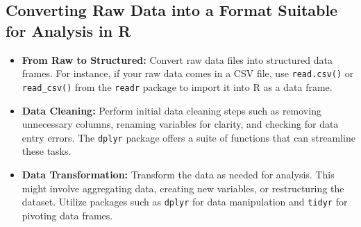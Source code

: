\documentclass[
]{book}
\newenvironment{Shaded}{\begin{snugshade}}{\end{snugshade}}
\newcommand{\AttributeTok}[1]{\textcolor[rgb]{0.13,0.29,0.53}{#1}}
\newcommand{\CommentTok}[1]{\textcolor[rgb]{0.56,0.35,0.01}{\textit{#1}}}
\newcommand{\ConstantTok}[1]{\textcolor[rgb]{0.56,0.35,0.01}{#1}}
\newcommand{\DecValTok}[1]{\textcolor[rgb]{0.00,0.00,0.81}{#1}}
\newcommand{\FunctionTok}[1]{\textcolor[rgb]{0.13,0.29,0.53}{\textbf{#1}}}
\newcommand{\NormalTok}[1]{#1}
\newcommand{\OtherTok}[1]{\textcolor[rgb]{0.56,0.35,0.01}{#1}}
\newcommand{\SpecialCharTok}[1]{\textcolor[rgb]{0.81,0.36,0.00}{\textbf{#1}}}
\newcommand{\StringTok}[1]{\textcolor[rgb]{0.31,0.60,0.02}{#1}}
\begin{document}
\begin{Shaded}
\end{Shaded}

\hypertarget{converting-raw-data-into-a-format-suitable-for-analysis-in-r}{%
\subsection*{Converting Raw Data into a Format Suitable for Analysis in R}\label{converting-raw-data-into-a-format-suitable-for-analysis-in-r}}

\begin{itemize}
\item
  \textbf{From Raw to Structured:} Convert raw data files into structured data frames. For instance, if your raw data comes in a CSV file, use \texttt{read.csv()} or \texttt{read\_csv()} from the \texttt{readr} package to import it into R as a data frame.
\item
  \textbf{Data Cleaning:} Perform initial data cleaning steps such as removing unnecessary columns, renaming variables for clarity, and checking for data entry errors. The \texttt{dplyr} package offers a suite of functions that can streamline these tasks.
\item
  \textbf{Data Transformation:} Transform the data as needed for analysis. This might involve aggregating data, creating new variables, or restructuring the dataset. Utilize packages such as \texttt{dplyr} for data manipulation and \texttt{tidyr} for pivoting data frames.
\end{itemize}
\end{document}

